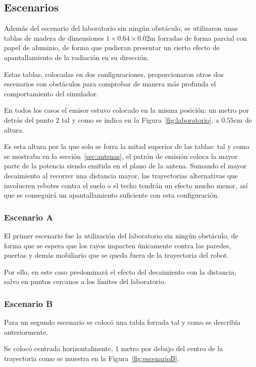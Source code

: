 \subsection{Escenarios}

Además del escenario del laboratorio sin ningún obstáculo, se utilizaron unas tablas de madera de dimensiones $1 \times 0.64 \times 0.02\si{\meter}$ forradas de forma parcial con papel de aluminio, de forma que pudieran presentar un cierto efecto de apantallamiento de la radiación en su dirección.

Estas tablas, colocadas en dos configuraciones, proporcionaron otros dos escenarios con obstáculos para comprobar de manera más profunda el comportamiento del simulador.

En todos los casos el emisor estuvo colocado en la misma posición: un metro por detrás del punto 2 tal y como se indica en la Figura~\ref{fig:laboratorio}, a $0.55\si{\centi\meter}$ de altura.

Es esta altura por la que solo se forra la mitad superior de las tablas: tal y como se mostraba en la sección~\ref{sec:antenas}, el patrón de emisión coloca la mayor parte de la potencia siendo emitida en el plano de la antena.
Sumando el mayor decaimiento al recorrer una distancia mayor, las trayectorias alternativas que involucren rebotes contra el suelo o el techo tendrán un efecto mucho menor, así que se conseguirá un apantallamiento suficiente con esta configuración.

\subsubsection{Escenario A}

El primer escenario fue la utilización del laboratorio sin ningún obstáculo, de forma que se espera que los rayos impacten únicamente contra las paredes, puertas y demás mobiliario que se queda fuera de la trayectoria del robot.

Por ello, en este caso predominará el efecto del decaimiento con la distancia, salvo en puntos cercanos a los límites del laboratorio.

\subsubsection{Escenario B}

Para un segundo escenario se colocó una tabla forrada tal y como se describía anteriormente.

Se colocó centrada horizontalmente, 1 metro por debajo del centro de la trayectoria como se muestra en la Figura~\ref{fig:escenarioB}.

